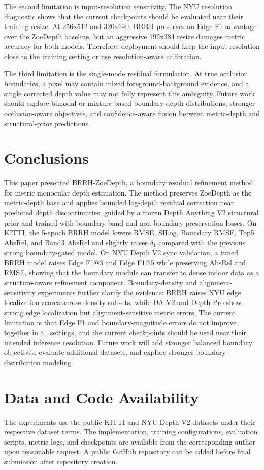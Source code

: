 \documentclass{ieeeaccess}
\begin{document}
The second limitation is input-resolution sensitivity. The NYU resolution diagnostic shows that the current checkpoints should be evaluated near their training resize. At 256x512 and 320x640, BRRH preserves an Edge F1 advantage over the ZoeDepth baseline, but an aggressive 192x384 resize damages metric accuracy for both models. Therefore, deployment should keep the input resolution close to the training setting or use resolution-aware calibration.

The third limitation is the single-mode residual formulation. At true occlusion boundaries, a pixel may contain mixed foreground-background evidence, and a single corrected depth value may not fully represent this ambiguity. Future work should explore bimodal or mixture-based boundary-depth distributions, stronger occlusion-aware objectives, and confidence-aware fusion between metric-depth and structural-prior predictions.

\section{Conclusions}

This paper presented BRRH-ZoeDepth, a boundary residual refinement method for metric monocular depth estimation. The method preserves ZoeDepth as the metric-depth base and applies bounded log-depth residual correction near predicted depth discontinuities, guided by a frozen Depth Anything V2 structural prior and trained with boundary-band and non-boundary preservation losses. On KITTI, the 5-epoch BRRH model lowers RMSE, SILog, Boundary RMSE, Top5 AbsRel, and Band3 AbsRel and slightly raises $\delta_1$ compared with the previous strong boundary-gated model. On NYU Depth V2 sync validation, a tuned BRRH model raises Edge F1@3 and Edge F1@5 while preserving AbsRel and RMSE, showing that the boundary module can transfer to dense indoor data as a structure-aware refinement component. Boundary-density and alignment-sensitivity experiments further clarify the evidence: BRRH raises NYU edge localization scores across density subsets, while DA-V2 and Depth Pro show strong edge localization but alignment-sensitive metric errors. The current limitation is that Edge F1 and boundary-magnitude errors do not improve together in all settings, and the current checkpoints should be used near their intended inference resolution. Future work will add stronger balanced boundary objectives, evaluate additional datasets, and explore stronger boundary-distribution modeling.


\section*{Data and Code Availability}

The experiments use the public KITTI and NYU Depth V2 datasets under their respective dataset terms. The implementation, training configurations, evaluation scripts, metric logs, and checkpoints are available from the corresponding author upon reasonable request. A public GitHub repository can be added before final submission after repository creation.




\EOD
\end{document}
